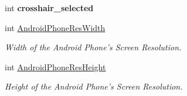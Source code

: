 \begin{DoxyCompactItemize}
\item 
\hypertarget{classtest_app_abd2b58403a31a721e2201c3012d3b4e3}{int {\bfseries crosshair\-\_\-selected}}\label{classtest_app_abd2b58403a31a721e2201c3012d3b4e3}

\item 
\hypertarget{classtest_app_a4930c7e7ecb7783261349fd2f2e22f8b}{int \hyperlink{classtest_app_a4930c7e7ecb7783261349fd2f2e22f8b}{Android\-Phone\-Res\-Width}}\label{classtest_app_a4930c7e7ecb7783261349fd2f2e22f8b}

\begin{DoxyCompactList}\small\item\em Width of the Android Phone's Screen Resolution. \end{DoxyCompactList}\item 
\hypertarget{classtest_app_a9389fab48c7bd5896f26d494fa238535}{int \hyperlink{classtest_app_a9389fab48c7bd5896f26d494fa238535}{Android\-Phone\-Res\-Height}}\label{classtest_app_a9389fab48c7bd5896f26d494fa238535}

\begin{DoxyCompactList}\small\item\em Height of the Android Phone's Screen Resolution. \end{DoxyCompactList}\end{DoxyCompactItemize}
